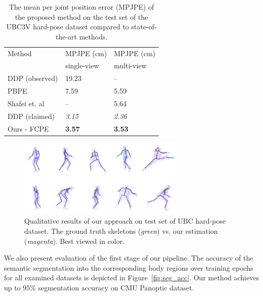 \setlength{\tabcolsep}{4pt}
\begin{table}[H]
\begin{center}
\caption[Mean per joint position error on UBC3V hard-pose dataset, compared to state-of-the-art methods.]{The mean per joint position error (MPJPE) of the proposed method on the test set of the UBC3V hard-pose dataset compared to state-of-the-art methods.}
\label{table:UBC_results}
\begin{tabular}{lll}
\hline\noalign{\smallskip}
Method & MPJPE (cm) & MPJPE (cm) \\
& single-view & multi-view\\
\noalign{\smallskip}
\hline
\noalign{\smallskip}
DDP (observed) &  19.23 & –\\
PBPE~\cite{Ali19} & 7.59 & 5.59\\
Shafei et. al~\cite{Shafaei16} & – & 5.64\\
DDP (claimed)~\cite{Marin18jvcir} & {\it 3.15} & {\it 2.36}\\
\hline\noalign{\smallskip}
Ours - FCPE & {\bf 3.57} & {\bf 3.53}\\
\hline
\end{tabular}
\end{center}
\end{table}
\setlength{\tabcolsep}{1.4pt}


\begin{figure}[H]
\begin{center}
\centering
\includegraphics[height=140px]{images/results/UBC_results.png}
\caption[Qualitative results on test set of UBC hard-pose dataset.]{Qualitative results of our approach on test set of UBC hard-pose dataset. The ground truth skeletons ({\it green}) vs. our estimation ({\it magenta}). Best viewed in color.}
\label{fig:ubc_results}
\end{center}
\end{figure}

\noindent
We also present evaluation of the first stage of our pipeline. The accuracy of the semantic segmentation into the corresponding body regions over training epochs for all examined datasets is depicted in Figure~\ref{fig:seg_acc}. Our method achieves up to $95\%$ segmentation accuracy on CMU Panoptic dataset.\par
\vspace{5mm}

